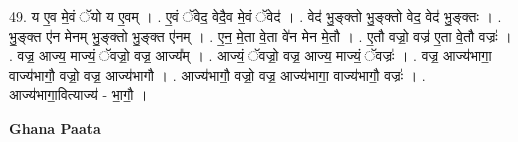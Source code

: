 \documentclass[17pt]{extarticle}
\begin{document}
49. य ए॒व मे॒वं ॅयो य ए॒वम् । . ए॒वं ॅवेद॒ वेदै॒व मे॒वं ॅवेद॑ । . वेद॑ भु॒ङ्क्तो भु॒ङ्क्तो वेद॒ वेद॑ भु॒ङ्क्तः । . भु॒ङ्क्त ए॑न मेनम् भु॒ङ्क्तो भु॒ङ्क्त ए॑नम् । . ए॒न॒ मे॒ता वे॒ता वे॑न मेन मे॒तौ । . ए॒तौ वज्रो॒ वज्र॑ ए॒ता वे॒तौ वज्रः॑ । . वज्र॒ आज्य॒ माज्यं॒ ॅवज्रो॒ वज्र॒ आज्य᳚म् । . आज्यं॒ ॅवज्रो॒ वज्र॒ आज्य॒ माज्यं॒ ॅवज्रः॑ । . वज्र॒ आज्य॑भागा॒ वाज्य॑भागौ॒ वज्रो॒ वज्र॒ आज्य॑भागौ । . आज्य॑भागौ॒ वज्रो॒ वज्र॒ आज्य॑भागा॒ वाज्य॑भागौ॒ वज्रः॑ । . आज्य॑भागा॒वित्याज्य॑ - भा॒गौ॒ । \newline

\textbf{Ghana Paata } \newline
\end{document}

